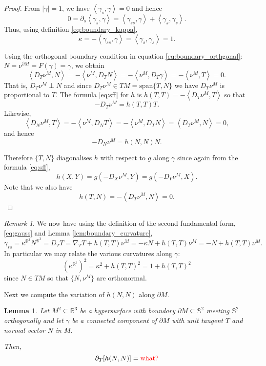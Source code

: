 \documentclass[10pt]{amsart}
\newcommand{\IP}[2]{\left< #1 , #2 \right>}
\newcommand{\R}{\ensuremath{\mathbb{R}}}
\renewcommand{\S}{\ensuremath{\mathbb{S}}}
\newtheorem{lem}[thm]{Lemma}
\theoremstyle{remark}
\newtheorem*{rmk}{Remark}
\begin{document}
\begin{proof}
From \(|\gamma| = 1\), we have \(\IP{\gamma_s}{\gamma} = 0\) and hence
\[
0 = \partial_s \IP{\gamma_s}{\gamma} = \IP{\gamma_{ss}}{\gamma} + \IP{\gamma_s}{\gamma_s}.
\]
Thus, using definition \eqref{eq:boundary_kappa},
\[
\kappa = -\IP{\gamma_{ss}}{\gamma} = \IP{\gamma_s}{\gamma_s} = 1.
\]

Using the orthogonal boundary condition in equation \eqref{eq:boundary_orthgonal}: \(N = \nu^{\partial M} = F(\gamma) = \gamma\), we obtain
\[
\IP{D_T \nu^M}{N} = -\IP{\nu^M}{D_T N} = -\IP{\nu^M}{D_T \gamma} = -\IP{\nu^M}{T} = 0.
\]
That is, \(D_T \nu^M \perp N\) and since \(D_T \nu^M \in TM = \text{span} \{T, N\}\) we have \(D_T \nu^M\) is proportional to \(T\). The formula \eqref{eq:sff} for \(h\) is \(h(T, T) = -\IP{D_T \nu^M}{T}\) so that
\[
-D_T \nu^M = h(T, T) T.
\]
Likewise,
\[
\IP{D_{N} \nu^M}{T} = -\IP{\nu^M}{D_{N} T} = -\IP{\nu^M}{D_T N} = \IP{D_T \nu^M}{N} = 0,
\]
and hence
\[
-D_N \nu^M = h(N, N) N.
\]

Therefore \(\{T, N\}\) diagonalises \(h\) with respect to \(g\) along \(\gamma\) since again from the formula \eqref{eq:sff},
\[
h(X, Y) = g(-D_X \nu^M, Y) = g(-D_Y \nu^M, X).
\]
Note that we also have
\[
h(T, N) = - \IP{D_T \nu^M}{N} = 0.
\]
\end{proof}

\begin{rmk}
We now have using the definition of the second fundamental form, \eqref{eq:gauss} and Lemma \ref{lem:boundary_curvature},
\[
\gamma_{ss} = \kappa^{\R^3} N^{\R^3} = D_T T = \nabla_T T + h(T, T)\nu^M = -\kappa N + h(T, T) \nu^M = -N + h(T, T) \nu^M.
\]
In particular we may relate the various curvatures along \(\gamma\):
\begin{equation}
\label{eq:boundary_curvature_relations}
(\kappa^{\R^3})^2 = \kappa^2 + h(T, T)^2 = 1 + h(T, T)^2
\end{equation}
since \(N \in TM\) so that \(\{N, \nu^M\}\) are orthonormal.
\end{rmk}

Next we compute the variation of \(h(N, N)\) along \(\partial M\).

\begin{lem}
\label{lem:hNN_variation}
Let \(M^2 \subseteq \R^3\) be a hypersurface with boundary \(\partial M \subseteq \S^2\) meeting \(\S^2\) orthogonally and let \(\gamma\) be a connected component of \(\partial M\) with unit tangent \(T\) and normal vector \(N\) in \(M\).

Then,
\[
\partial_T [h(N, N)] = {\color{red} \text{what?}}
\]
\end{lem}
\end{document}
